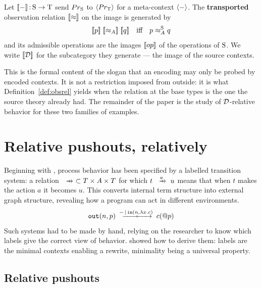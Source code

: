 \documentclass{article}
\begin{document}
\begin{definition}
\label{def:transported}
    Let $[\![-]\!]\,{:}\, \mathrm{S}\to \mathrm{T}$ send $Pr_{\mathrm{S}}$ to $\langle Pr_{\mathrm{T}}\rangle$ for a meta-context $\langle -\rangle$. The \textbf{transported} observation relation $[\![\approx]\!]$ on the image is generated by
    \[[\![p]\!]\;[\![\approx_{A}]\!]\;[\![q]\!]\quad\text{iff}\quad p\approx_{A}^{\mathrm{S}} q\]
    and its admissible operations are the images $[\![op]\!]$ of the operations of $\mathrm{S}$. We write $[\![\mathcal{D}]\!]$ for the subcategory they generate --- the image of the source contexts.
\end{definition}

This is the formal content of the slogan that an encoding may only be probed by encoded contexts. It is not a restriction imposed from outside: it is what Definition~\ref{def:obsrel} yields when the relation at the base types is the one the source theory already had. The remainder of the paper is the study of $\mathcal{D}$-relative behavior for these two families of examples.
\section{Relative pushouts, relatively}
\label{sec:drel}

Beginning with \citet{ccs}, process behavior has been specified by a labelled transition system: a relation $\xr{}\subset T\times A\times T$ for which $t\xr{a} u$ means that when $t$ makes the action $a$ it becomes $u$. This converts internal term structure into external graph structure, revealing how a program can act in different environments.
\[\mtt{out}(n,p) \xr{-\pr \mtt{in}(n,\lambda x.c)} c(@p)\]
Such systems had to be made by hand, relying on the researcher to know which labels give the correct view of behavior. \citet{lm} showed how to derive them: labels are the minimal contexts enabling a rewrite, minimality being a universal property.

\subsection{Relative pushouts}
\end{document}
